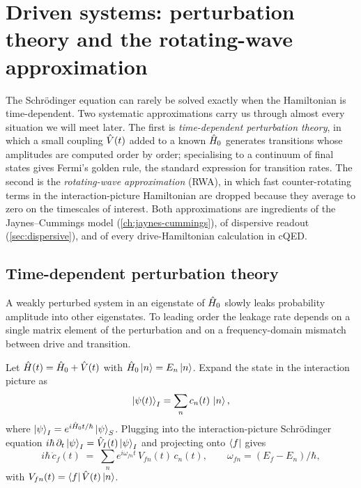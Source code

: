 \chapter{Driven systems: perturbation theory and the rotating-wave approximation}
\label{ch:perturbations}


The Schr\"odinger equation can rarely be solved exactly when the
Hamiltonian is time-dependent. Two systematic approximations carry us
through almost every situation we will meet later. The first is
\emph{time-dependent perturbation theory}, in which a small coupling
$\hat{V}(t)$ added to a known $\hat{H}_0$ generates transitions whose
amplitudes are computed order by order; specialising to a continuum
of final states gives Fermi's golden rule, the standard expression
for transition rates. The second is the \emph{rotating-wave
approximation} (RWA), in which fast counter-rotating terms in the
interaction-picture Hamiltonian are dropped because they average to
zero on the timescales of interest. Both approximations are
ingredients of the Jaynes--Cummings model
(\cref{ch:jaynes-cummings}), of dispersive readout
(\cref{sec:dispersive}), and of every drive-Hamiltonian calculation
in cQED.

\section{Time-dependent perturbation theory}
\label{sec:tdpt}

\begin{phenomenon}
A weakly perturbed system in an eigenstate of $\hat{H}_0$ slowly
leaks probability amplitude into other eigenstates. To leading order
the leakage rate depends on a single matrix element of the
perturbation and on a frequency-domain mismatch between drive and
transition.
\end{phenomenon}

Let $\hat{H}(t)=\hat{H}_0+\hat{V}(t)$ with $\hat{H}_0\ket{n}=E_n\ket{n}$.
Expand the state in the interaction picture as
\begin{equation}
\ket{\psi(t)}_I = \sum_n c_n(t)\,\ket{n},
\end{equation}
where $\ket{\psi}_I=e^{i\hat{H}_0 t/\hbar}\ket{\psi}_S$. Plugging into
the interaction-picture Schr\"odinger equation
$i\hbar\,\partial_t\ket{\psi}_I=\hat{V}_I(t)\ket{\psi}_I$ and projecting
onto $\bra{f}$ gives
\begin{equation}
\label{eq:cdot-exact}
i\hbar\,\dot c_f(t) \;=\; \sum_n e^{i\omega_{fn}t}\,V_{fn}(t)\,c_n(t),
\qquad \omega_{fn}=(E_f-E_n)/\hbar,
\end{equation}
with $V_{fn}(t)=\bra{f}\hat{V}(t)\ket{n}$.

